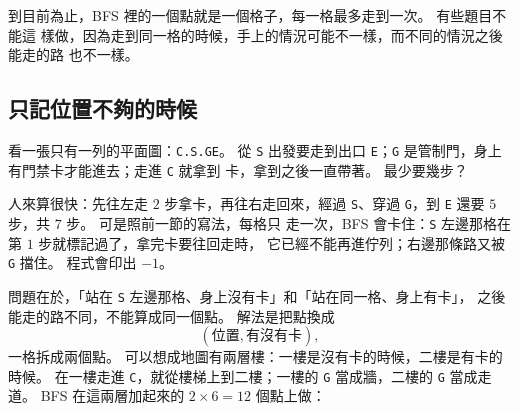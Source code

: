 到目前為止，BFS 裡的一個點就是一個格子，每一格最多走到一次。 有些題目不能這
樣做，因為走到同一格的時候，手上的情況可能不一樣，而不同的情況之後能走的路
也不一樣。

\subsection{只記位置不夠的時候}

看一張只有一列的平面圖：\texttt{C.S.GE}。 從 \texttt{S} 出發要走到出口
\texttt{E}；\texttt{G} 是管制門，身上有門禁卡才能進去；走進 \texttt{C} 就拿到
卡，拿到之後一直帶著。 最少要幾步？

人來算很快：先往左走 $2$ 步拿卡，再往右走回來，經過 \texttt{S}、穿過
\texttt{G}，到 \texttt{E} 還要 $5$ 步，共 $7$ 步。 可是照前一節的寫法，每格只
走一次，BFS 會卡住：\texttt{S} 左邊那格在第 $1$ 步就標記過了，拿完卡要往回走時，
它已經不能再進佇列；右邊那條路又被 \texttt{G} 擋住。 程式會印出 $-1$。

問題在於，「站在 \texttt{S} 左邊那格、身上沒有卡」和「站在同一格、身上有卡」，
之後能走的路不同，不能算成同一個點。 解法是把點換成
\[
(\text{位置}, \text{有沒有卡}),
\]
一格拆成兩個點。 可以想成地圖有兩層樓：一樓是沒有卡的時候，二樓是有卡的時候。
在一樓走進 \texttt{C}，就從樓梯上到二樓；一樓的 \texttt{G} 當成牆，二樓的
\texttt{G} 當成走道。 BFS 在這兩層加起來的 $2 \times 6 = 12$ 個點上做：

\begin{center}
\par\nopagebreak
{}
\label{fig:card-layers}
\end{center}

